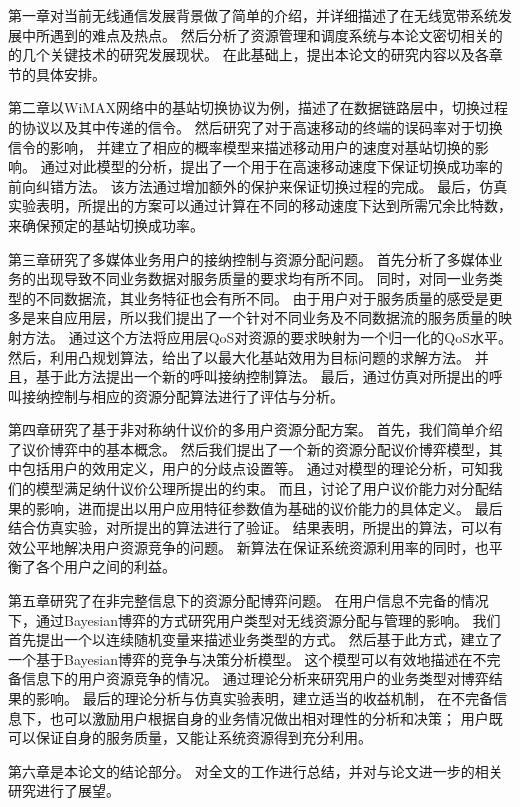 第一章对当前无线通信发展背景做了简单的介绍，并详细描述了在无线宽带系统发展中所遇到的难点及热点。
然后分析了资源管理和调度系统与本论文密切相关的的几个关键技术的研究发展现状。
在此基础上，提出本论文的研究内容以及各章节的具体安排。
\par %
第二章以WiMAX网络中的基站切换协议为例，描述了在数据链路层中，切换过程的协议以及其中传递的信令。
然后研究了对于高速移动的终端的误码率对于切换信令的影响，
并建立了相应的概率模型来描述移动用户的速度对基站切换的影响。
通过对此模型的分析，提出了一个用于在高速移动速度下保证切换成功率的前向纠错方法。
该方法通过增加额外的保护来保证切换过程的完成。
最后，仿真实验表明，所提出的方案可以通过计算在不同的移动速度下达到所需冗余比特数，来确保预定的基站切换成功率。

第三章研究了多媒体业务用户的接纳控制与资源分配问题。
首先分析了多媒体业务的出现导致不同业务数据对服务质量的要求均有所不同。
同时，对同一业务类型的不同数据流，其业务特征也会有所不同。
由于用户对于服务质量的感受是更多是来自应用层，所以我们提出了一个针对不同业务及不同数据流的服务质量的映射方法。
通过这个方法将应用层QoS对资源的要求映射为一个归一化的QoS水平。
然后，利用凸规划算法，给出了以最大化基站效用为目标问题的求解方法。
并且，基于此方法提出一个新的呼叫接纳控制算法。
最后，通过仿真对所提出的呼叫接纳控制与相应的资源分配算法进行了评估与分析。


第四章研究了基于非对称纳什议价的多用户资源分配方案。
首先，我们简单介绍了议价博弈中的基本概念。
然后我们提出了一个新的资源分配议价博弈模型，其中包括用户的效用定义，用户的分歧点设置等。
通过对模型的理论分析，可知我们的模型满足纳什议价公理所提出的约束。
而且，讨论了用户议价能力对分配结果的影响，进而提出以用户应用特征参数值为基础的议价能力的具体定义。
最后结合仿真实验，对所提出的算法进行了验证。
结果表明，所提出的算法，可以有效公平地解决用户资源竞争的问题。
新算法在保证系统资源利用率的同时，也平衡了各个用户之间的利益。

第五章研究了在非完整信息下的资源分配博弈问题。
在用户信息不完备的情况下，通过Bayesian博弈的方式研究用户类型对无线资源分配与管理的影响。
我们首先提出一个以连续随机变量来描述业务类型的方式。
然后基于此方式，建立了一个基于Bayesian博弈的竞争与决策分析模型。
这个模型可以有效地描述在不完备信息下的用户资源竞争的情况。
通过理论分析来研究用户的业务类型对博弈结果的影响。
最后的理论分析与仿真实验表明，建立适当的收益机制，
在不完备信息下，也可以激励用户根据自身的业务情况做出相对理性的分析和决策；
用户既可以保证自身的服务质量，又能让系统资源得到充分利用。

\par 第六章是本论文的结论部分。
对全文的工作进行总结，并对与论文进一步的相关研究进行了展望。
